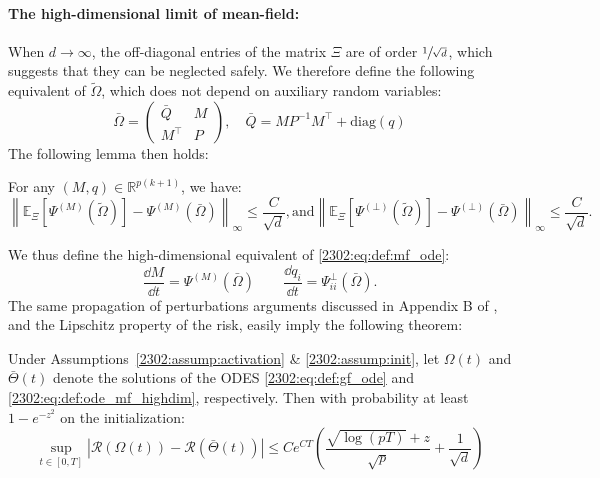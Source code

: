 \paragraph{The high-dimensional limit of mean-field:} When $d \to \infty$, the off-diagonal entries of the matrix $\Xi$ are of order $\sfrac{1}{\sqrt{d}}$, which suggests that they can be neglected safely. We therefore define the following equivalent of $\tilde\Omega$, which does not depend on auxiliary random variables:
\begin{equation}
    \label{2302:eq:def:overlaps_mf_highdim}
    \bar\Omega = \begin{pmatrix} \bar Q & M \\
        M^\top & P 
    \end{pmatrix}, \quad \bar Q = MP^{-1}M^\top + \mathrm{diag}(q)
\end{equation}
The following lemma then holds:
\begin{lemma}\label{2302:lem:Psi_lipschitz}
    For any $(M, q)\in \mathbb{R}^{p(k+1)}$, we have:
    \begin{equation}
    \left\lVert\mathbb{E}_{\Xi}\left[\Psi^{(M)}(\tilde\Omega)\right] - \Psi^{(M)}(\bar\Omega)\right\rVert_\infty \leq \frac{C}{\sqrt{d}} ,
    \text{and}  
     \left\lVert\mathbb{E}_{\Xi}\left[\Psi^{(\bot)}(\tilde\Omega)\right] - \Psi^{(\bot)}(\bar\Omega)\right\rVert_\infty \leq \frac{C}{\sqrt{d}} .
\end{equation}
\end{lemma}
We thus define the high-dimensional equivalent of \eqref{2302:eq:def:mf_ode}:
\begin{equation}
    \label{2302:eq:def:ode_mf_highdim}
    \frac{\dd{M}}{\dd{t}} = \Psi^{(M)}(\bar \Omega) \qquad \frac{\dd{q}_i}{\dd{t}} = \Psi^{\bot}_{ii}(\bar \Omega).
\end{equation}
The same propagation of perturbations arguments discussed in Appendix B of \cite{veiga2022phase}, and the Lipschitz property of the risk, easily imply the following theorem:
\begin{theorem}
    Under Assumptions~\ref{2302:assump:activation} \& \ref{2302:assump:init}, let $\Omega(t)$ and $\bar{\Theta}(t)$ denote the solutions of the ODES \eqref{2302:eq:def:gf_ode} and \eqref{2302:eq:def:ode_mf_highdim}, respectively. Then with probability at least $1 - e^{-z^2}$ on the initialization:
    \[ \sup_{t \in [0, T]} \left| \mathcal R(\Omega(t)) - \mathcal R(\bar{\Theta}(t)) \right| \leq Ce^{CT}\left(\frac{\sqrt{\log(pT)} + z}{\sqrt{p}} + \frac1{\sqrt{d}} \right) \]
\end{theorem}
